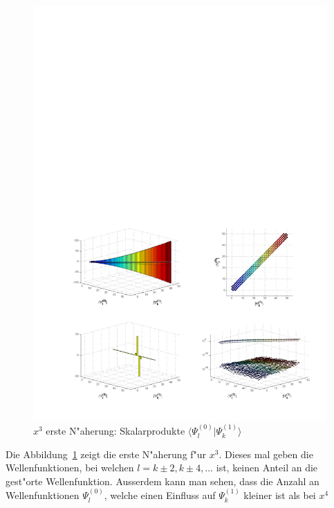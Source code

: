 \begin{refsection}
\begin{figure}	%
\centering
\includegraphics[width=1.0\textwidth]{anharmonisch/images/x3/Stoerung1Skalare.pdf}
\caption{$x^3$ erste N"aherung: Skalarprodukte $\langle\Psi_l^{(0)}|\Psi_k^{(1)}\rangle$  
\label{skript:x3_Stoerung1Skalare}}
\end{figure}

Die Abbildung~\ref{skript:x3_Stoerung1Skalare} zeigt die erste N"aherung f"ur $x^3$.
Dieses mal geben die Wellenfunktionen, bei welchen $l=k\pm 2,k\pm 4,\dots$ ist,
keinen Anteil an die gest"orte Wellenfunktion.
Ausserdem kann man sehen, dass die Anzahl an Wellenfunktionen $\Psi_l^{(0)}$,
welche einen Einfluss auf $\Psi_k^{(1)}$ kleiner ist als bei $x^4$


\end{refsection}
